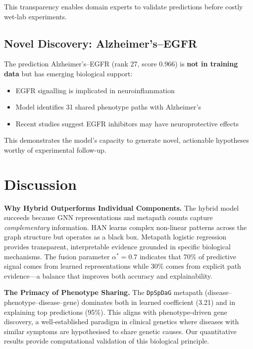 \documentclass{article}
\begin{document}
This transparency enables domain experts to validate predictions before costly wet-lab experiments.

\subsection{Novel Discovery: Alzheimer's--EGFR}

The prediction Alzheimer's--EGFR (rank 27, score 0.966) is \textbf{not in training data} but has emerging biological support:
\begin{itemize}
\item EGFR signalling is implicated in neuroinflammation
\item Model identifies 31 shared phenotype paths with Alzheimer's
\item Recent studies suggest EGFR inhibitors may have neuroprotective effects
\end{itemize}

This demonstrates the model's capacity to generate novel, actionable hypotheses worthy of experimental follow-up.

\section{Discussion}
\label{sec:discussion}

\textbf{Why Hybrid Outperforms Individual Components.} The hybrid model succeeds because GNN representations and metapath counts capture \textit{complementary} information. HAN learns complex non-linear patterns across the graph structure but operates as a black box. Metapath logistic regression provides transparent, interpretable evidence grounded in specific biological mechanisms. The fusion parameter $\alpha^*=0.7$ indicates that 70\% of predictive signal comes from learned representations while 30\% comes from explicit path evidence---a balance that improves both accuracy and explainability.

\textbf{The Primacy of Phenotype Sharing.} The \texttt{DpSpDaG} metapath (disease--phenotype--disease--gene) dominates both in learned coefficient (3.21) and in explaining top predictions (95\%). This aligns with phenotype-driven gene discovery, a well-established paradigm in clinical genetics where diseases with similar symptoms are hypothesised to share genetic causes. Our quantitative results provide computational validation of this biological principle.
\end{document}
